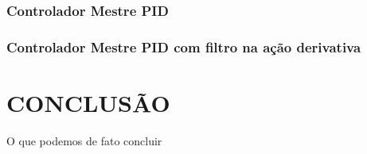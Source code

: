 \documentclass[a4paper,12pt]{article}
\begin{document}
\subsubsection{Controlador Mestre PID}

\subsubsection{Controlador Mestre PID com filtro na ação derivativa }

\newpage


\thispagestyle{main}

\section{CONCLUSÃO}\hspace{4ex}
O que podemos de fato concluir

\newpage




{}


\appendix


\end{document}
